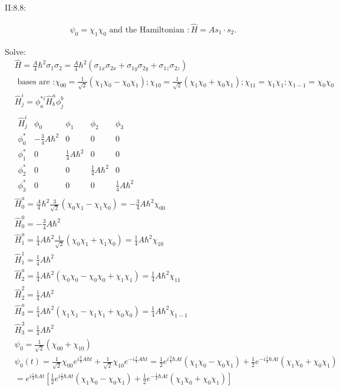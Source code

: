\documentclass{article}
\begin{document}
\newpage
II:8.8:

\begin{align*}\psi_0=\chi_1\chi_0 \text{ and the Hamiltonian }:\hat H=As_1\cdot s_2.\end{align*}

Solve:
\begin{align*}
  &\hat H=\frac{A}4\hbar^2\sigma_1\sigma_2=\frac{A}4\hbar^2(\sigma_{1x}\sigma_{2x}+\sigma_{1y}\sigma_{2y}+\sigma_{1z}\sigma_{2z})\\
  &\text{ bases are :}\chi_{00}=\frac1{\sqrt{2}}(\chi_1\chi_0-\chi_0\chi_1);\chi_{10}=\frac1{\sqrt{2}}(\chi_1\chi_0+\chi_0\chi_1);\chi_{11}=\chi_1\chi_1;\chi_{1-1}=\chi_0\chi_0\\
  &\hat H^i_j=\phi^{*i}_a\hat H^a_b\phi_j^b\\
  &\begin{matrix}
    \hat H^i_j&\phi_0&\phi_1&\phi_2&\phi_3\\
    \phi^*_0&-\frac34A\hbar^2&0&0&0\\
    \phi^*_1&0&\frac14A\hbar^2&0&0\\
    \phi^*_2&0&0&\frac14A\hbar^2&0\\
    \phi^*_3&0&0&0&\frac14A\hbar^2
  \end{matrix}\\
  &\hat H^a_0=\frac{A}4\hbar^2\frac3{\sqrt{2}}(\chi_0\chi_1-\chi_1\chi_0)=-\frac34A\hbar^2\chi_{00}\\
  &\hat H^0_0=-\frac34A\hbar^2\\
  &\hat H^a_1=\frac14A\hbar^2\frac1{\sqrt{2}}(\chi_0\chi_1+\chi_1\chi_0)=\frac14A\hbar^2\chi_{10}\\
  &\hat H^1_1=\frac14A\hbar^2\\
  &\hat H^a_2=\frac14A\hbar^2(\chi_0\chi_0-\chi_0\chi_0+\chi_1\chi_1)=\frac14A\hbar^2\chi_{11}\\
  &\hat H^2_2=\frac14A\hbar^2\\
  &\hat H^a_3=\frac14A\hbar^2(\chi_1\chi_1-\chi_1\chi_1+\chi_0\chi_0)=\frac14A\hbar^2\chi_{1-1}\\
  &\hat H^3_3=\frac14A\hbar^2\\
  &\psi_0=\frac1{\sqrt{2}}(\chi_{00}+\chi_{10})\\
  &\psi_0(t)=\frac1{\sqrt{2}}\chi_{00}e^{i\frac34A\hbar t}+\frac1{\sqrt{2}}\chi_{10}e^{-i\frac14A\hbar t}=\frac1{2}e^{i\frac34\hbar At}(\chi_1\chi_0-\chi_0\chi_1)+\frac12e^{-i\frac14\hbar At}(\chi_1\chi_0+\chi_0\chi_1)\\
  &=e^{i\frac14\hbar At}[\frac12e^{i\frac12\hbar At}(\chi_1\chi_0-\chi_0\chi_1)+\frac12e^{-\frac12\hbar At}(\chi_1\chi_0+\chi_0\chi_1)]  \\
\end{align*}
\end{document}
